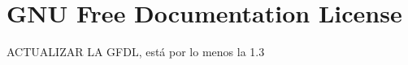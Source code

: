 \chapter{GNU Free Documentation License}

{\Huge ACTUALIZAR LA GFDL, está por lo menos la 1.3}

\label{sec:fdl}
